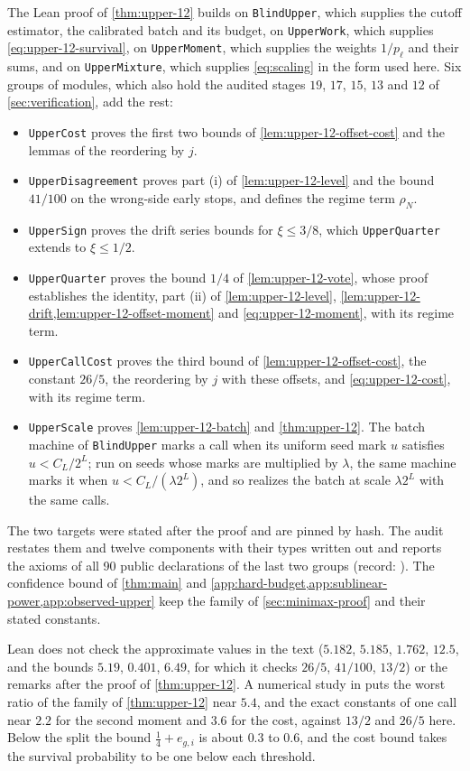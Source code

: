 The Lean proof of \cref{thm:upper-12} builds on \texttt{BlindUpper},
which supplies the cutoff estimator, the calibrated batch and its budget,
on \texttt{UpperWork}, which supplies \eqref{eq:upper-12-survival}, on
\texttt{UpperMoment}, which supplies the weights $1/p_\ell$ and their sums,
and on \texttt{UpperMixture}, which supplies \eqref{eq:scaling} in the form
used here. Six groups of modules, which also hold the audited stages $19$,
$17$, $15$, $13$ and $12$ of \cref{sec:verification}, add the rest:
\begin{itemize}
\item \texttt{UpperCost} proves the first two bounds of
 \cref{lem:upper-12-offset-cost} and the lemmas of the reordering by $j$.
\item \texttt{UpperDisagreement} proves part (i) of
 \cref{lem:upper-12-level} and the bound $41/100$ on the wrong-side early
 stops, and defines the regime term $\rho_N$.
\item \texttt{UpperSign} proves the drift series bounds for $\xi\le3/8$,
 which \texttt{UpperQuarter} extends to $\xi\le1/2$.
\item \texttt{UpperQuarter} proves the bound $1/4$ of
 \cref{lem:upper-12-vote}, whose proof establishes the identity, part (ii) of
 \cref{lem:upper-12-level},
 \cref{lem:upper-12-drift,lem:upper-12-offset-moment} and
 \eqref{eq:upper-12-moment}, with its regime term.
\item \texttt{UpperCallCost} proves the third bound of
 \cref{lem:upper-12-offset-cost}, the constant $26/5$, the reordering by
 $j$ with these offsets, and \eqref{eq:upper-12-cost}, with its regime
 term.
\item \texttt{UpperScale} proves \cref{lem:upper-12-batch} and
 \cref{thm:upper-12}. The batch machine of \texttt{BlindUpper} marks a
 call when its uniform seed mark $u$ satisfies $u<C_L/2^L$; run on seeds
 whose marks are multiplied by $\lambda$, the same machine marks it when
 $u<C_L/(\lambda2^L)$, and so realizes the batch at scale $\lambda2^L$ with
 the same calls.
\end{itemize}
The two targets were stated after the proof and are pinned by hash. The
audit  restates them and twelve components
with their types written out and reports the axioms of all 90 public
declarations of the last two groups (record:
). The confidence bound of
\cref{thm:main} and \cref{app:hard-budget,app:sublinear-power,app:observed-upper}
keep the family of \cref{sec:minimax-proof} and their stated constants.

Lean does not check the approximate values in the text ($5.182$, $5.185$,
$1.762$, $12.5$, and the bounds $5.19$, $0.401$, $6.49$, for which it checks
$26/5$, $41/100$, $13/2$) or the remarks after the proof of \cref{thm:upper-12}.
A numerical study in  puts the
worst ratio of the family of \cref{thm:upper-12} near $5.4$, and the exact
constants of one call near $2.2$ for the second moment and $3.6$ for the cost,
against $13/2$ and $26/5$ here. Below the split the bound $\tfrac14+e_{g,i}$
is about $0.3$ to $0.6$, and the cost bound takes the survival probability to
be one below each threshold.
